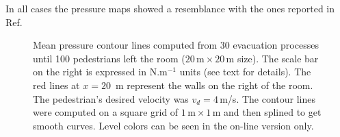 {\color{red} In all cases the pressure maps showed a resemblance with the ones reported in Ref.~\cite{Zhang}}\\

\begin{figure}[!htbp]
\hfill
{}
\caption{\label{fig:16and17} Mean pressure contour lines computed from 30 
evacuation processes until 100 pedestrians left the room 
($20\,\mathrm{m}\times20\,\mathrm{m}$ size). The scale bar on the right is 
expressed in N.m$^{-1}$ units (see text for details). The red lines at 
$x=20$~m represent the walls on the right of the room. The pedestrian's desired 
velocity was $v_d=4\,$m/s. The contour lines were computed on a square grid of 
$1\,\mathrm{m}\times1\,\mathrm{m}$ and then splined to get smooth curves. Level 
colors can be seen in the on-line version only.} 
\end{figure}


